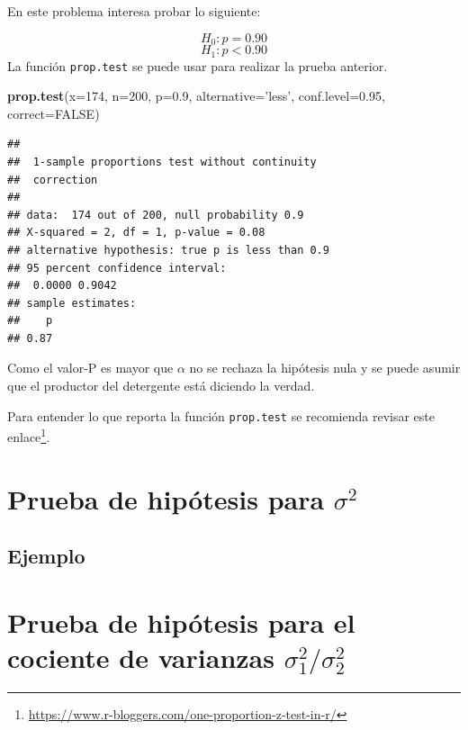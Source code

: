 \documentclass[10pt,]{krantz}
\makeatletter
\newenvironment{Shaded}{\begin{snugshade}}{\end{snugshade}}
\newcommand{\KeywordTok}[1]{\textcolor[rgb]{0.13,0.29,0.53}{\textbf{{#1}}}}
\newcommand{\DataTypeTok}[1]{\textcolor[rgb]{0.13,0.29,0.53}{{#1}}}
\newcommand{\DecValTok}[1]{\textcolor[rgb]{0.00,0.00,0.81}{{#1}}}
\newcommand{\FloatTok}[1]{\textcolor[rgb]{0.00,0.00,0.81}{{#1}}}
\newcommand{\StringTok}[1]{\textcolor[rgb]{0.31,0.60,0.02}{{#1}}}
\newcommand{\OtherTok}[1]{\textcolor[rgb]{0.56,0.35,0.01}{{#1}}}
\newcommand{\NormalTok}[1]{{#1}}
\renewcommand{\href}[2]{#2\footnote{\url{#1}}}
\newenvironment{kframe}{%
\medskip{}
\setlength{\fboxsep}{.8em}
 \def\at@end@of@kframe{}%
 \ifinner\ifhmode%
  \def\at@end@of@kframe{\end{minipage}}%
  \begin{minipage}{\columnwidth}%
 \fi\fi%
 \def\FrameCommand##1{\hskip\@totalleftmargin \hskip-\fboxsep
 \colorbox{shadecolor}{##1}\hskip-\fboxsep
     \hskip-\linewidth \hskip-\@totalleftmargin \hskip\columnwidth}%
 \MakeFramed {\advance\hsize-\width
   \@totalleftmargin\z@ \linewidth\hsize
   \@setminipage}}%
 {\par\unskip\endMakeFramed%
 \at@end@of@kframe}
\renewenvironment{Shaded}{\begin{kframe}}{\end{kframe}}
\makeatother
\begin{document}
En este problema interesa probar lo siguiente:

\[H_0: p = 0.90\] \[H_1: p < 0.90\] La función \texttt{prop.test} se
puede usar para realizar la prueba anterior.

\begin{Shaded}
\begin{Highlighting}[]
\KeywordTok{prop.test}\NormalTok{(}\DataTypeTok{x=}\DecValTok{174}\NormalTok{, }\DataTypeTok{n=}\DecValTok{200}\NormalTok{, }\DataTypeTok{p=}\FloatTok{0.9}\NormalTok{, }\DataTypeTok{alternative=}\StringTok{'less'}\NormalTok{,}
          \DataTypeTok{conf.level=}\FloatTok{0.95}\NormalTok{, }\DataTypeTok{correct=}\OtherTok{FALSE}\NormalTok{)}
\end{Highlighting}
\end{Shaded}

\begin{verbatim}
## 
##  1-sample proportions test without continuity
##  correction
## 
## data:  174 out of 200, null probability 0.9
## X-squared = 2, df = 1, p-value = 0.08
## alternative hypothesis: true p is less than 0.9
## 95 percent confidence interval:
##  0.0000 0.9042
## sample estimates:
##    p 
## 0.87
\end{verbatim}

Como el valor-P es mayor que \(\alpha\) no se rechaza la hipótesis nula
y se puede asumir que el productor del detergente está diciendo la
verdad.

Para entender lo que reporta la función \texttt{prop.test} se recomienda
revisar este
\href{https://www.r-bloggers.com/one-proportion-z-test-in-r/}{enlace}.

\section{\texorpdfstring{Prueba de hipótesis para
\(\sigma^2\)}{Prueba de hipótesis para \textbackslash{}sigma\^{}2}}\label{prueba-de-hipotesis-para-sigma2}

\subsection*{Ejemplo}\label{ejemplo-64}


\section{\texorpdfstring{Prueba de hipótesis para el cociente de
varianzas
\(\sigma_1^2 / \sigma_2^2\)}{Prueba de hipótesis para el cociente de varianzas \textbackslash{}sigma\_1\^{}2 / \textbackslash{}sigma\_2\^{}2}}\label{prueba-de-hipotesis-para-el-cociente-de-varianzas-sigma_12-sigma_22}
\end{document}
